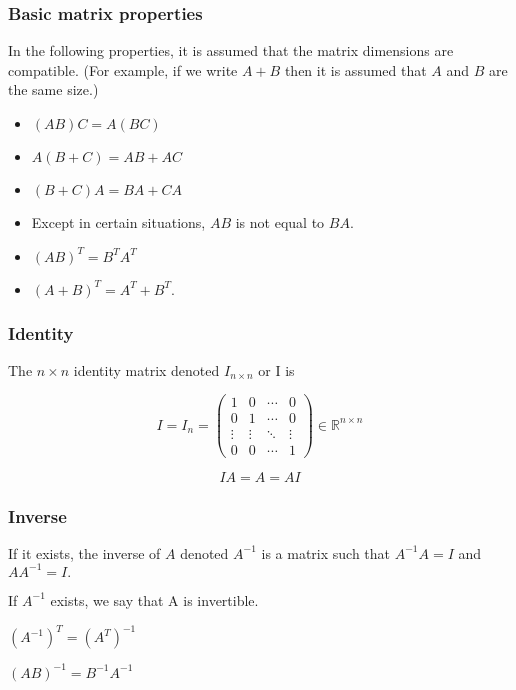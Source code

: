 \documentclass[mathserif]{beamer}
\begin{document}
\begin{frame}
\frametitle{Basic matrix properties}

In the following properties, it is assumed that the matrix
dimensions are compatible. (For example, if we write $A + B$ then
it is assumed that $A$ and $B$ are the same size.)

\begin{itemize}
\item $(AB) C = A (BC)$
\item $A (B + C) = AB + AC$
\item $(B + C) A = BA + CA$
\item Except in certain situations, $AB$ is not equal to $BA.$ 
\item $(AB)^T = B^TA^T$
\item $(A + B)^T = A^T + B^T.$
\end{itemize}

\end{frame}

\begin{frame}
\frametitle{Identity}

The $n \times n$ identity matrix denoted $I_{n \times n}$ or I is 

$$
I = I_n = \begin{pmatrix}
1 & 0 & \cdots & 0 \\
0 & 1 & \cdots & 0 \\
\vdots & \vdots & \ddots & \vdots \\
0 & 0 & \cdots & 1
\end{pmatrix} \in \mathbb{R}^{n \times n}
$$
\vspace*{1em}

$$IA = A = AI$$

\end{frame}

\begin{frame}
\frametitle{Inverse}

If it exists, the inverse of $A$ denoted $A^{-1}$ is a matrix such that $A^{-1}A = I$ and $AA^{-1} = I.$

\vspace*{1em}

If $A^{-1}$ exists, we say that A is invertible. 

\vspace*{1em}


$(A^{-1})^T = (A^T)^{-1}$

\vspace*{1em}

$(AB)^{-1} = B^{-1}A^{-1}$


\end{frame}
\end{document}
